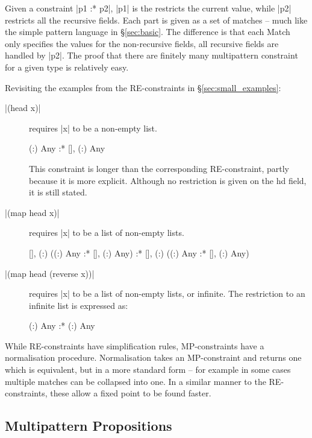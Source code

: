 \documentclass[preprint]{sigplanconf}
\newcommand{\C}[1]{\textsf{#1}}
\begin{document}
Given a constraint |p1 :* p2|, |p1| is the restricts the current value, while |p2| restricts all the recursive fields. Each part is given as a set of matches -- much like the simple pattern language in \S\ref{sec:basic}. The difference is that each \C{Match} only specifies the values for the non-recursive fields, all recursive fields are handled by |p2|. The proof that there are finitely many multipattern constraint for a given type is relatively easy.

Revisiting the examples from the RE-constraints in \S\ref{sec:small_examples}:

\begin{description}
\item[|(head x)|] requires |x| to be a non-empty list.

    \begin{code}
    {(:) Any} :* {[], (:) Any}
    \end{code}

    This constraint is longer than the corresponding RE-constraint, partly because it is more explicit. Although no restriction is given on the \C{hd} field, it is still stated.

\item[|(map head x)|] requires |x| to be a list of non-empty lists.

    \begin{code}
    {[], (:) ({(:) Any} :* {[], (:) Any})}
    :*
    {[], (:) ({(:) Any} :* {[], (:) Any})}
    \end{code}

\item[|(map head (reverse x))|] requires |x| to be a list of non-empty lists, or infinite. The restriction to an infinite list is expressed as:

    \begin{code}
    {(:) Any} :* {(:) Any}
    \end{code}
\end{description}

While RE-constraints have simplification rules, MP-constraints have a normalisation procedure. Normalisation takes an MP-constraint and returns one which is equivalent, but in a more standard form -- for example in some cases multiple matches can be collapsed into one. In a similar manner to the RE-constraints, these allow a fixed point to be found faster.

\subsection{Multipattern Propositions}
\end{document}
